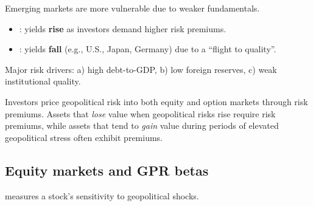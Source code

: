 Emerging markets are more vulnerable due to weaker fundamentals.

\begin{cikeybox}[title={The yield split, which runs in both directions at once}]
\begin{itemize}
\item {}: yields \textcolor{FRMRed}{\bfseries rise} as investors demand
higher risk premiums.
\item {}: yields \textcolor{FRMGreen}{\bfseries fall} (e.g., U.S., Japan,
Germany) due to a ``flight to quality''.
\end{itemize}
\vspace{3pt}
Major risk drivers: a) high debt-to-GDP, b) low foreign reserves, c) weak institutional
quality.
\end{cikeybox}


Investors price geopolitical risk into both equity and option markets through risk premiums.
Assets that \emph{lose} value when geopolitical risks rise require  risk
premiums, while assets that tend to \emph{gain} value during periods of elevated geopolitical
stress often exhibit  premiums.

\subsection*{Equity markets and GPR betas}

 measures a stock's sensitivity to geopolitical shocks.

